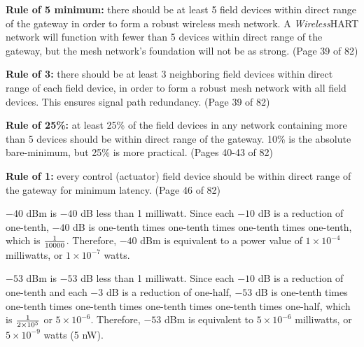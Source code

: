 





{\bf Rule of 5 minimum:} there should be at least 5 field devices within direct range of the gateway in order to form a robust wireless mesh network.  A {\sl Wireless}HART network will function with fewer than 5 devices within direct range of the gateway, but the mesh network's foundation will not be as strong.  (Page 39 of 82)

\vskip 10pt

{\bf Rule of 3:} there should be at least 3 neighboring field devices within direct range of each field device, in order to form a robust mesh network with all field devices.  This ensures signal path redundancy.  (Page 39 of 82) 

\vskip 10pt

{\bf Rule of 25\%:} at least 25\% of the field devices in any network containing more than 5 devices should be within direct range of the gateway.  10\% is the absolute bare-minimum, but 25\% is more practical.  (Pages 40-43 of 82)

\vskip 10pt

{\bf Rule of 1:} every control (actuator) field device should be within direct range of the gateway for minimum latency.  (Page 46 of 82) 


\vskip 30pt

\noindent
$-40$ dBm is $-40$ dB less than 1 milliwatt.  Since each $-10$ dB is a reduction of one-tenth, $-40$ dB is one-tenth times one-tenth times one-tenth times one-tenth, which is $1 \over 10000$.  Therefore, $-40$ dBm is equivalent to a power value of $1 \times 10^{-4}$ milliwatts, or $1 \times 10^{-7}$ watts.

\vskip 10pt

\noindent
$-53$ dBm is $-53$ dB less than 1 milliwatt.  Since each $-10$ dB is a reduction of one-tenth and each $-3$ dB is a reduction of one-half, $-53$ dB is one-tenth times one-tenth times one-tenth times one-tenth times one-tenth times one-half, which is $1 \over {2 \times 10^5}$ or $5 \times 10^{-6}$.  Therefore, $-53$ dBm is equivalent to $5 \times 10^{-6}$ milliwatts, or $5 \times 10^{-9}$ watts (5 nW).  











